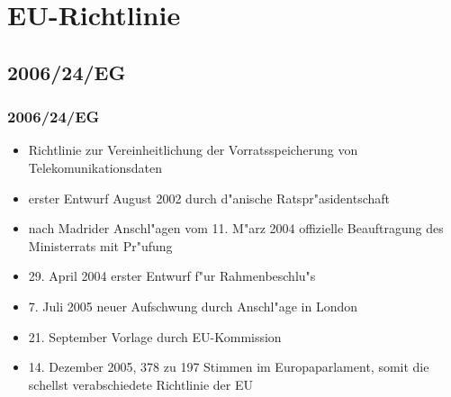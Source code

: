 
\section{EU-Richtlinie}
    \subsection{2006/24/EG}
    \begin{frame}
      \frametitle{2006/24/EG}
      \begin{itemize}
        \item
          Richtlinie zur Vereinheitlichung der Vorratsspeicherung von Telekomunikationsdaten
        \item
          erster Entwurf August 2002 durch d"anische Ratspr"asidentschaft
        \item
          nach Madrider Anschl"agen vom 11. M"arz 2004 offizielle Beauftragung des Ministerrats mit Pr"ufung
        \item
          29. April 2004 erster Entwurf f"ur Rahmenbeschlu"s
        \item 
          7. Juli 2005 neuer Aufschwung durch Anschl"age in London
        \item
          21. September Vorlage durch EU-Kommission
        \item
          14. Dezember 2005, 378 zu 197 Stimmen im Europaparlament, somit die schellst verabschiedete Richtlinie der EU


      \end{itemize}
    \end{frame}

